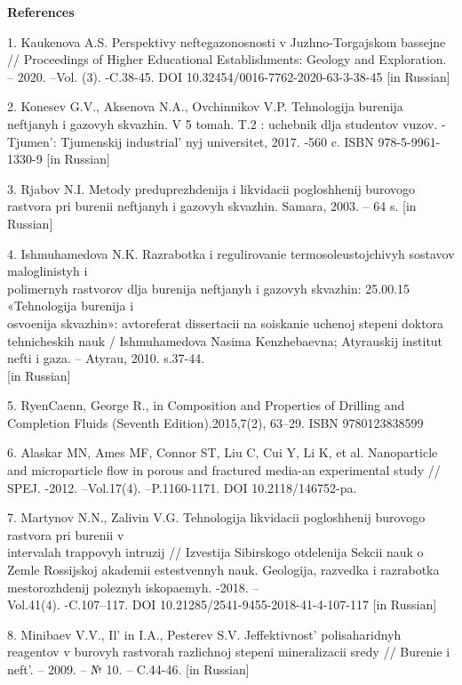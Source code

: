 \begin{center}
{\bfseries References}
\end{center}

\begin{references}
1. Kaukenova A.S. Perspektivy neftegazonosnosti v Juzhno-Torgajskom
bassejne // Proceedings of Higher Educational Establishments: Geology
and Exploration. -- 2020. --Vol. (3). -C.38-45. DOI
10.32454/0016-7762-2020-63-3-38-45 {[}in Russian{]}

2. Konesev G.V., Aksenova N.A., Ovchinnikov V.P. Tehnologija burenija
neftjanyh i gazovyh skvazhin. V 5 tomah. T.2 : uchebnik dlja studentov
vuzov. -Tjumen': Tjumenskij
industrial' nyj universitet, 2017. -560 c. ISBN
978-5-9961-1330-9 {[}in Russian{]}

3. Rjabov N.I. Metody preduprezhdenija i likvidacii pogloshhenij
burovogo rastvora pri burenii neftjanyh i gazovyh skvazhin. Samara,
2003. -- 64 s. {[}in Russian{]}

4. Ishmuhamedova N.K. Razrabotka i regulirovanie termosoleustojchivyh
sostavov maloglinistyh i \\polimernyh rastvorov dlja burenija neftjanyh i
gazovyh skvazhin: 25.00.15 «Tehnologija burenija i \\osvoenija skvazhin»:
avtoreferat dissertacii na soiskanie uchenoj stepeni doktora
tehnicheskih nauk / Ishmuhamedova Nasima Kenzhebaevna; Atyrauskij
institut nefti i gaza. -- Atyrau, 2010. s.37-44. \\{[}in Russian{]}

5. RyenCaenn, George R., in Composition and Properties of Drilling and
Completion Fluids (Seventh Edition).2015,7(2), 63--29. ISBN
9780123838599

6. Alaskar MN, Ames MF, Connor ST, Liu C, Cui Y, Li K, et al.
Nanoparticle and microparticle flow in porous and fractured media-an
experimental study // SPEJ. -2012. --Vol.17(4). --P.1160-1171. DOI
10.2118/146752-pa.

7. Martynov N.N., Zalivin V.G. Tehnologija likvidacii pogloshhenij
burovogo rastvora pri burenii v \\intervalah trappovyh intruzij //
Izvestija Sibirskogo otdelenija Sekcii nauk o Zemle Rossijskoj akademii
estestvennyh nauk. Geologija, razvedka i razrabotka mestorozhdenij
poleznyh iskopaemyh. -2018. --\\Vol.41(4). -C.107--117. DOI
10.21285/2541-9455-2018-41-4-107-117 {[}in Russian{]}

8. Minibaev V.V., Il' in I.A., Pesterev S.V.
Jeffektivnost'{} polisaharidnyh reagentov v burovyh
rastvorah razlichnoj stepeni mineralizacii sredy // Burenie i
neft'. -- 2009. -- № 10. -- C.44-46. {[}in Russian{]}


\end{references}
